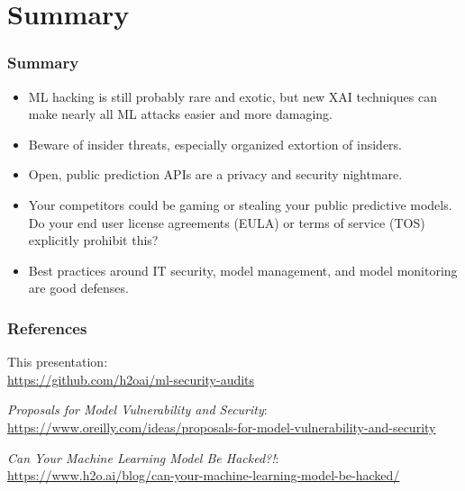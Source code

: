 \documentclass[11pt,
               aspectratio=169,
               hyperref={colorlinks}
               ]{beamer}
\begin{document}
	\section{Summary}

		\begin{frame}
		
			\frametitle{Summary}		
			
			\begin{itemize}
				\item ML hacking is still probably rare and exotic, but new XAI techniques can make nearly all ML attacks easier and more damaging.
				\item Beware of insider threats, especially organized extortion of insiders. 
				\item Open, public prediction APIs are a privacy and security nightmare. 
				\item Your competitors could be gaming or stealing your public predictive models. Do your end user license agreements (EULA) or terms of service (TOS) explicitly prohibit this?
				\item Best practices around IT security, model management, and model monitoring are good defenses.
			\end{itemize}
		
		\end{frame}



	\begin{frame}[t, allowframebreaks]
	
		\frametitle{References}	
		
			This presentation:\\
			\footnotesize{\url{https://github.com/h2oai/ml-security-audits}}\normalsize
			
			\vspace{10pt}
		
			\textit{Proposals for Model Vulnerability and Security}:\\
			\footnotesize{\url{https://www.oreilly.com/ideas/proposals-for-model-vulnerability-and-security}}\normalsize
			
			\vspace{10pt}
			
			\textit{Can Your Machine Learning Model Be Hacked?!}:\\
			\footnotesize{\url{https://www.h2o.ai/blog/can-your-machine-learning-model-be-hacked/}}
			
		
		\framebreak		
		
		\printbibliography
		
	\end{frame}
\end{document}
